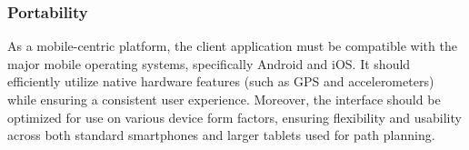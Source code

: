 \subsubsection{Portability}
As a mobile-centric platform, the client application must be compatible with the major mobile operating systems, specifically Android and iOS. It should efficiently utilize native hardware features (such as GPS and accelerometers) while ensuring a consistent user experience. Moreover, the interface should be optimized for use on various device form factors, ensuring flexibility and usability across both standard smartphones and larger tablets used for path planning.
